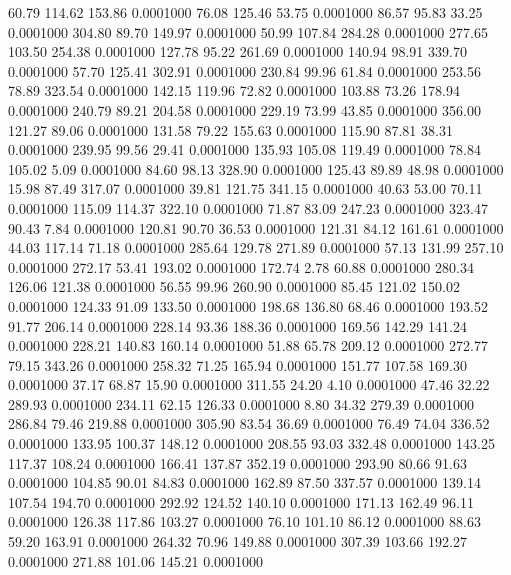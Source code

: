   60.79  114.62  153.86   0.0001000
  76.08  125.46   53.75   0.0001000
  86.57   95.83   33.25   0.0001000
 304.80   89.70  149.97   0.0001000
  50.99  107.84  284.28   0.0001000
 277.65  103.50  254.38   0.0001000
 127.78   95.22  261.69   0.0001000
 140.94   98.91  339.70   0.0001000
  57.70  125.41  302.91   0.0001000
 230.84   99.96   61.84   0.0001000
 253.56   78.89  323.54   0.0001000
 142.15  119.96   72.82   0.0001000
 103.88   73.26  178.94   0.0001000
 240.79   89.21  204.58   0.0001000
 229.19   73.99   43.85   0.0001000
 356.00  121.27   89.06   0.0001000
 131.58   79.22  155.63   0.0001000
 115.90   87.81   38.31   0.0001000
 239.95   99.56   29.41   0.0001000
 135.93  105.08  119.49   0.0001000
  78.84  105.02    5.09   0.0001000
  84.60   98.13  328.90   0.0001000
 125.43   89.89   48.98   0.0001000
  15.98   87.49  317.07   0.0001000
  39.81  121.75  341.15   0.0001000
  40.63   53.00   70.11   0.0001000
 115.09  114.37  322.10   0.0001000
  71.87   83.09  247.23   0.0001000
 323.47   90.43    7.84   0.0001000
 120.81   90.70   36.53   0.0001000
 121.31   84.12  161.61   0.0001000
  44.03  117.14   71.18   0.0001000
 285.64  129.78  271.89   0.0001000
  57.13  131.99  257.10   0.0001000
 272.17   53.41  193.02   0.0001000
 172.74    2.78   60.88   0.0001000
 280.34  126.06  121.38   0.0001000
  56.55   99.96  260.90   0.0001000
  85.45  121.02  150.02   0.0001000
 124.33   91.09  133.50   0.0001000
 198.68  136.80   68.46   0.0001000
 193.52   91.77  206.14   0.0001000
 228.14   93.36  188.36   0.0001000
 169.56  142.29  141.24   0.0001000
 228.21  140.83  160.14   0.0001000
  51.88   65.78  209.12   0.0001000
 272.77   79.15  343.26   0.0001000
 258.32   71.25  165.94   0.0001000
 151.77  107.58  169.30   0.0001000
  37.17   68.87   15.90   0.0001000
 311.55   24.20    4.10   0.0001000
  47.46   32.22  289.93   0.0001000
 234.11   62.15  126.33   0.0001000
   8.80   34.32  279.39   0.0001000
 286.84   79.46  219.88   0.0001000
 305.90   83.54   36.69   0.0001000
  76.49   74.04  336.52   0.0001000
 133.95  100.37  148.12   0.0001000
 208.55   93.03  332.48   0.0001000
 143.25  117.37  108.24   0.0001000
 166.41  137.87  352.19   0.0001000
 293.90   80.66   91.63   0.0001000
 104.85   90.01   84.83   0.0001000
 162.89   87.50  337.57   0.0001000
 139.14  107.54  194.70   0.0001000
 292.92  124.52  140.10   0.0001000
 171.13  162.49   96.11   0.0001000
 126.38  117.86  103.27   0.0001000
  76.10  101.10   86.12   0.0001000
  88.63   59.20  163.91   0.0001000
 264.32   70.96  149.88   0.0001000
 307.39  103.66  192.27   0.0001000
 271.88  101.06  145.21   0.0001000
